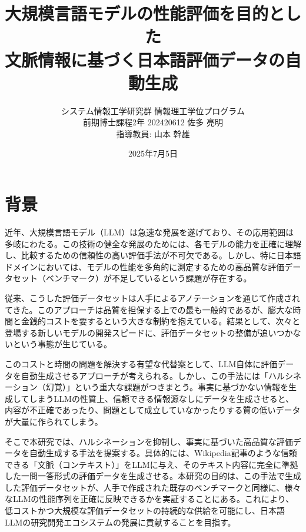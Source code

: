 \documentclass[twocolumn]{jsarticle}
\begin{document}
\title{\vspace{-3cm}大規模言語モデルの性能評価を目的とした\\
文脈情報に基づく日本語評価データの自動生成}
\author{
  システム情報工学研究群 情報理工学位プログラム\\
  前期博士課程2年 202420612 佐多 亮明\\
  指導教員: 山本 幹雄
}
\date{2025年7月5日}
\maketitle



\section{背景}
近年、大規模言語モデル（LLM）は急速な発展を遂げており、その応用範囲は多岐にわたる。この技術の健全な発展のためには、各モデルの能力を正確に理解し、比較するための信頼性の高い評価手法が不可欠である。しかし、特に日本語ドメインにおいては、モデルの性能を多角的に測定するための高品質な評価データセット（ベンチマーク）が不足しているという課題が存在する。

従来、こうした評価データセットは人手によるアノテーションを通じて作成されてきた。このアプローチは品質を担保する上での最も一般的であるが、膨大な時間と金銭的コストを要するという大きな制約を抱えている。結果として、次々と登場する新しいモデルの開発スピードに、評価データセットの整備が追いつかないという事態が生じている。

このコストと時間の問題を解決する有望な代替案として、LLM自体に評価データを自動生成させるアプローチが考えられる。しかし、この手法には「ハルシネーション（幻覚）」という重大な課題がつきまとう。事実に基づかない情報を生成してしまうLLMの性質上、信頼できる情報源なしにデータを生成させると、内容が不正確であったり、問題として成立していなかったりする質の低いデータが大量に作られてしまう。

そこで本研究では、ハルシネーションを抑制し、事実に基づいた高品質な評価データを自動生成する手法を提案する。具体的には、Wikipedia記事のような信頼できる「文脈（コンテキスト）」をLLMに与え、そのテキスト内容に完全に準拠した一問一答形式の評価データを生成させる。本研究の目的は、この手法で生成した評価データセットが、人手で作成された既存のベンチマークと同様に、様々なLLMの性能序列を正確に反映できるかを実証することにある。これにより、低コストかつ大規模な評価データセットの持続的な供給を可能にし、日本語LLMの研究開発エコシステムの発展に貢献することを目指す。
\end{document}
